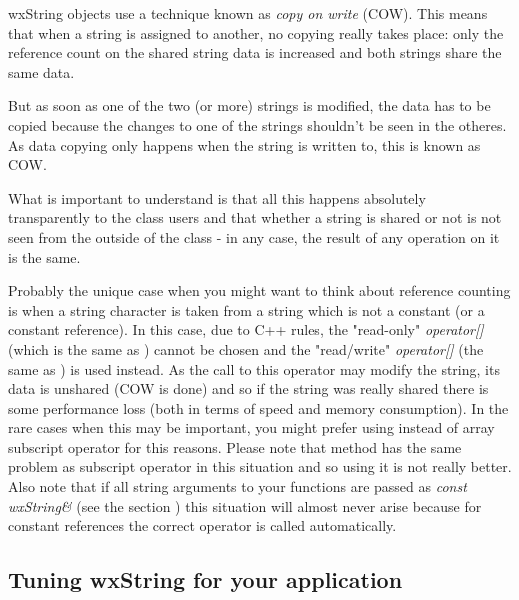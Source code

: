 wxString objects use a technique known as {\it copy on write} (COW). This means
that when a string is assigned to another, no copying really takes place: only
the reference count on the shared string data is increased and both strings
share the same data.

But as soon as one of the two (or more) strings is modified, the data has to be
copied because the changes to one of the strings shouldn't be seen in the
otheres. As data copying only happens when the string is written to, this is
known as COW.

What is important to understand is that all this happens absolutely
transparently to the class users and that whether a string is shared or not is
not seen from the outside of the class - in any case, the result of any
operation on it is the same.

Probably the unique case when you might want to think about reference
counting is when a string character is taken from a string which is not a
constant (or a constant reference). In this case, due to C++ rules, the
"read-only" {\it operator[]} (which is the same as 
) cannot be chosen and the "read/write"
{\it operator[]} (the same as 
) is used instead. As the
call to this operator may modify the string, its data is unshared (COW is done)
and so if the string was really shared there is some performance loss (both in
terms of speed and memory consumption). In the rare cases when this may be
important, you might prefer using  instead
of array subscript operator for this reasons. Please note that 
 method has the same problem as subscript operator in
this situation and so using it is not really better. Also note that if all
string arguments to your functions are passed as {\it const wxString\&} (see the
section ) this situation will almost
never arise because for constant references the correct operator is called automatically.

\subsection{Tuning wxString for your application}\label{wxstringtuning}


